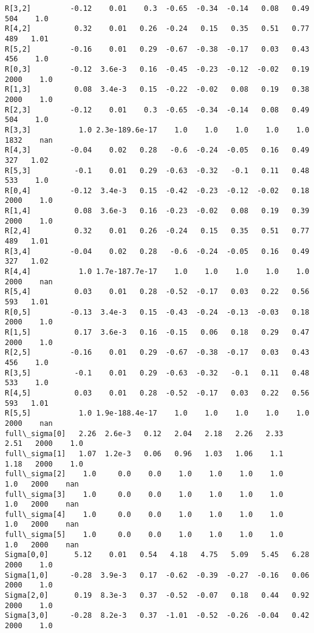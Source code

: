 \documentclass[11pt]{article}
\begin{document}
\begin{Verbatim}[commandchars=\\\{\}]
R[3,2]         -0.12    0.01    0.3  -0.65  -0.34  -0.14   0.08   0.49    504    1.0
R[4,2]          0.32    0.01   0.26  -0.24   0.15   0.35   0.51   0.77    489   1.01
R[5,2]         -0.16    0.01   0.29  -0.67  -0.38  -0.17   0.03   0.43    456    1.0
R[0,3]         -0.12  3.6e-3   0.16  -0.45  -0.23  -0.12  -0.02   0.19   2000    1.0
R[1,3]          0.08  3.4e-3   0.15  -0.22  -0.02   0.08   0.19   0.38   2000    1.0
R[2,3]         -0.12    0.01    0.3  -0.65  -0.34  -0.14   0.08   0.49    504    1.0
R[3,3]           1.0 2.3e-189.6e-17    1.0    1.0    1.0    1.0    1.0   1832    nan
R[4,3]         -0.04    0.02   0.28   -0.6  -0.24  -0.05   0.16   0.49    327   1.02
R[5,3]          -0.1    0.01   0.29  -0.63  -0.32   -0.1   0.11   0.48    533    1.0
R[0,4]         -0.12  3.4e-3   0.15  -0.42  -0.23  -0.12  -0.02   0.18   2000    1.0
R[1,4]          0.08  3.6e-3   0.16  -0.23  -0.02   0.08   0.19   0.39   2000    1.0
R[2,4]          0.32    0.01   0.26  -0.24   0.15   0.35   0.51   0.77    489   1.01
R[3,4]         -0.04    0.02   0.28   -0.6  -0.24  -0.05   0.16   0.49    327   1.02
R[4,4]           1.0 1.7e-187.7e-17    1.0    1.0    1.0    1.0    1.0   2000    nan
R[5,4]          0.03    0.01   0.28  -0.52  -0.17   0.03   0.22   0.56    593   1.01
R[0,5]         -0.13  3.4e-3   0.15  -0.43  -0.24  -0.13  -0.03   0.18   2000    1.0
R[1,5]          0.17  3.6e-3   0.16  -0.15   0.06   0.18   0.29   0.47   2000    1.0
R[2,5]         -0.16    0.01   0.29  -0.67  -0.38  -0.17   0.03   0.43    456    1.0
R[3,5]          -0.1    0.01   0.29  -0.63  -0.32   -0.1   0.11   0.48    533    1.0
R[4,5]          0.03    0.01   0.28  -0.52  -0.17   0.03   0.22   0.56    593   1.01
R[5,5]           1.0 1.9e-188.4e-17    1.0    1.0    1.0    1.0    1.0   2000    nan
full\_sigma[0]   2.26  2.6e-3   0.12   2.04   2.18   2.26   2.33   2.51   2000    1.0
full\_sigma[1]   1.07  1.2e-3   0.06   0.96   1.03   1.06    1.1   1.18   2000    1.0
full\_sigma[2]    1.0     0.0    0.0    1.0    1.0    1.0    1.0    1.0   2000    nan
full\_sigma[3]    1.0     0.0    0.0    1.0    1.0    1.0    1.0    1.0   2000    nan
full\_sigma[4]    1.0     0.0    0.0    1.0    1.0    1.0    1.0    1.0   2000    nan
full\_sigma[5]    1.0     0.0    0.0    1.0    1.0    1.0    1.0    1.0   2000    nan
Sigma[0,0]      5.12    0.01   0.54   4.18   4.75   5.09   5.45   6.28   2000    1.0
Sigma[1,0]     -0.28  3.9e-3   0.17  -0.62  -0.39  -0.27  -0.16   0.06   2000    1.0
Sigma[2,0]      0.19  8.3e-3   0.37  -0.52  -0.07   0.18   0.44   0.92   2000    1.0
Sigma[3,0]     -0.28  8.2e-3   0.37  -1.01  -0.52  -0.26  -0.04   0.42   2000    1.0

\end{Verbatim}
\end{document}
